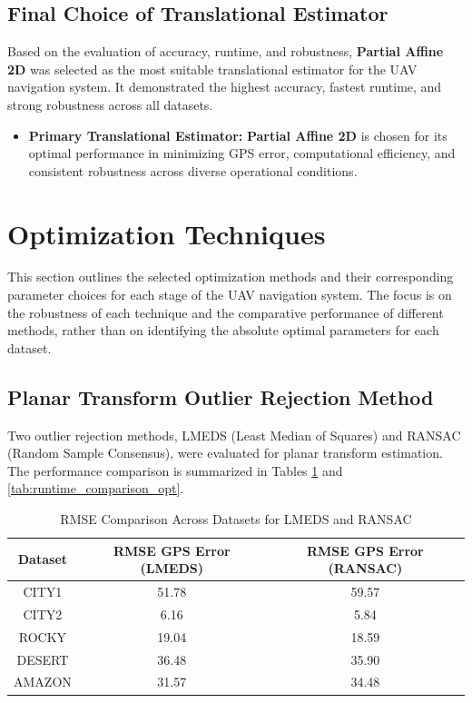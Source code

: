 \subsection{Final Choice of Translational Estimator}

Based on the evaluation of accuracy, runtime, and robustness, \textbf{Partial Affine 2D} was selected as the most suitable translational estimator for the UAV navigation system. It demonstrated the highest accuracy, fastest runtime, and strong robustness across all datasets.

\begin{itemize}
    \item \textbf{Primary Translational Estimator:} \textbf{Partial Affine 2D} is chosen for its optimal performance in minimizing GPS error, computational efficiency, and consistent robustness across diverse operational conditions.
\end{itemize}




\section{Optimization Techniques}

This section outlines the selected optimization methods and their corresponding parameter choices for each stage of the UAV navigation system. The focus is on the robustness of each technique and the comparative performance of different methods, rather than on identifying the absolute optimal parameters for each dataset.

\subsection{Planar Transform Outlier Rejection Method}

Two outlier rejection methods, LMEDS (Least Median of Squares) and RANSAC (Random Sample Consensus), were evaluated for planar transform estimation. The performance comparison is summarized in Tables \ref{tab:rmse_comparison_opt} and \ref{tab:runtime_comparison_opt}.

\begin{table}[H]
    \centering
    \caption{RMSE Comparison Across Datasets for LMEDS and RANSAC}
    \label{tab:rmse_comparison_opt}
    \begin{tabular}{|c|c|c|}
    \hline
    \textbf{Dataset} & \textbf{RMSE GPS Error (LMEDS)} & \textbf{RMSE GPS Error (RANSAC)} \\ \hline
    CITY1   & 51.78 & 59.57 \\ \hline
    CITY2   & 6.16  & 5.84  \\ \hline
    ROCKY   & 19.04 & 18.59 \\ \hline
    DESERT  & 36.48 & 35.90 \\ \hline
    AMAZON  & 31.57 & 34.48 \\ \hline
    \end{tabular}
\end{table}

